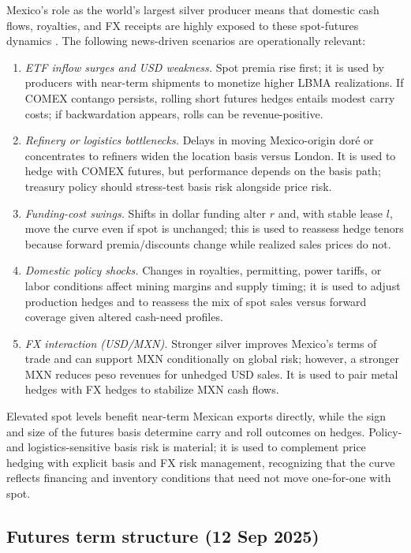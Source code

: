 \documentclass[11pt,a4paper]{article} %
\begin{document}
Mexico's role as the world's largest silver producer means that domestic cash flows, royalties, and FX receipts are highly exposed to these spot-futures dynamics \citep{reuters_mx_top_silver}. The following news-driven scenarios are operationally relevant:
\begin{enumerate}
  \item \textit{ETF inflow surges and USD weakness.} Spot premia rise first; it is used by producers with near-term shipments to monetize higher LBMA realizations. If COMEX contango persists, rolling short futures hedges entails modest carry costs; if backwardation appears, rolls can be revenue-positive.
  \item \textit{Refinery or logistics bottlenecks.} Delays in moving Mexico-origin doré or concentrates to refiners widen the location basis versus London. It is used to hedge with COMEX futures, but performance depends on the basis path; treasury policy should stress-test basis risk alongside price risk.
  \item \textit{Funding-cost swings.} Shifts in dollar funding alter \(r\) and, with stable lease \(l\), move the curve even if spot is unchanged; this is used to reassess hedge tenors because forward premia/discounts change while realized sales prices do not.
  \item \textit{Domestic policy shocks.} Changes in royalties, permitting, power tariffs, or labor conditions affect mining margins and supply timing; it is used to adjust production hedges and to reassess the mix of spot sales versus forward coverage given altered cash-need profiles.
  \item \textit{FX interaction (USD/MXN).} Stronger silver improves Mexico's terms of trade and can support MXN conditionally on global risk; however, a stronger MXN reduces peso revenues for unhedged USD sales. It is used to pair metal hedges with FX hedges to stabilize MXN cash flows.
\end{enumerate}
Elevated spot levels benefit near-term Mexican exports directly, while the sign and size of the futures basis determine carry and roll outcomes on hedges. Policy- and logistics-sensitive basis risk is material; it is used to complement price hedging with explicit basis and FX risk management, recognizing that the curve reflects financing and inventory conditions that need not move one-for-one with spot.



\subsection{Futures term structure (12 Sep 2025)}
\end{document}
